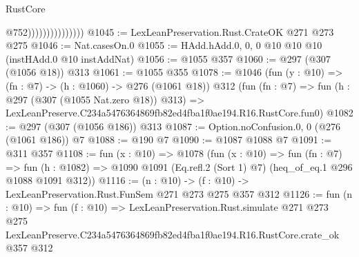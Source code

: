 \begin{lexlean}{RustCore}
\begin{coremodule}
                                  @752)))))))))))))))
@1045 := LexLeanPreservation.Rust.CrateOK @271 @273 @275
@1046 := Nat.casesOn.{0}
@1055 := HAdd.hAdd.{0, 0, 0} @10 @10 @10 (instHAdd.{0} @10 instAddNat)
@1056 := @1055 @357
@1060 := @297 (@307 (@1056 @18)) @313
@1061 := @1055 @355
@1078 := @1046
    (fun (y : @10) => (fn : @7) -> (h : @1060) -> @276 (@1061 @18))
    @312
    (fun (fn : @7) =>
    fun (h : @297 (@307 (@1055 Nat.zero @18)) @313) =>
    LexLeanPreserve.C234a5476364869fb82ed4fba1f0ae194.R16.RustCore.fun0)
@1082 := @297 (@307 (@1056 @186)) @313
@1087 := Option.noConfusion.{0, 0} (@276 (@1061 @186)) @7
@1088 := @190 @7
@1090 := @1087 @1088 @7
@1091 := @311 @357
@1108 := fun (x : @10) =>
  @1078
    (fun (x : @10) =>
    fun (fn : @7) =>
    fun (h : @1082) => @1090 @1091 (Eq.refl.{2} (Sort 1) @7) (heq_of_eq.{1} @296 @1088 @1091 @312))
@1116 := (n : @10) -> (f : @10) -> LexLeanPreservation.Rust.FunSem @271 @273 @275 @357 @312
@1126 := fun (n : @10) =>
  fun (f : @10) =>
  LexLeanPreservation.Rust.simulate
    @271
    @273
    @275
    LexLeanPreserve.C234a5476364869fb82ed4fba1f0ae194.R16.RustCore.crate_ok
    @357
    @312
\end{coremodule}
\end{lexlean}
